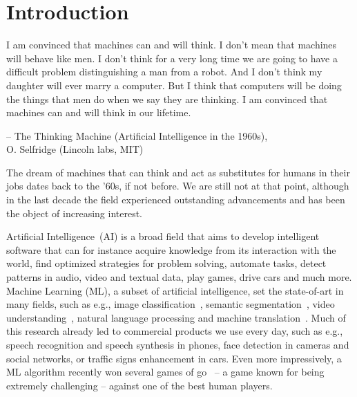 \chapter{Introduction}


{
    \setlength\epigraphwidth{10cm}
    \setlength\epigraphrule{0pt}
    \renewcommand{\epigraphflush}{center}
    \epigraph{
        I am convinced that machines can and will think. I don't mean that
        machines will behave like men. I don't think for a very long time we
        are going to have a difficult problem distinguishing a man from a
        robot. And I don't think my daughter will ever marry a computer. But I
        think that computers will be doing the things that men do when we say
        they are thinking. I am convinced that machines can and will think in
        our lifetime.}{-- \textup{The Thinking Machine (Artificial Intelligence
            in the 1960s)}, \\ O. Selfridge (Lincoln labs, MIT)}
}

The dream of machines that can think and act as substitutes for humans in their
jobs dates back to the '60s, if not before. We are still not at that point,
although in the last decade the field experienced outstanding advancements and
has been the object of increasing interest.

Artificial Intelligence~(AI) is a broad field that aims to develop intelligent
software that can for instance acquire knowledge from its interaction with the
world, find optimized strategies for problem solving, automate tasks, detect
patterns in audio, video and textual data, play games, drive cars and much
more. Machine Learning (ML), a subset of artificial intelligence, set the
state-of-art in many fields, such as e.g., image classification~\citep{
Krizhevsky-2012,szegedy2016inception,visin2015renet}, semantic
segmentation~\citep{chen2015semantic, Visin_2016_CVPR_Workshops}, video
understanding~\citep{srivastava2015unsupervised, Xu-et-al-arxiv2015}, natural
language processing and machine translation~\citep{Bahdanau-et-al-arxiv2014}.
Much of this research already led to commercial products we use every day, such
as e.g., speech recognition and speech synthesis in phones, face detection in
cameras and social networks, or traffic signs enhancement in cars. Even more
impressively, a ML algorithm recently won several games of go~\citep{
silver2016alphago} -- a game known for being extremely challenging -- against
one of the best human players.

